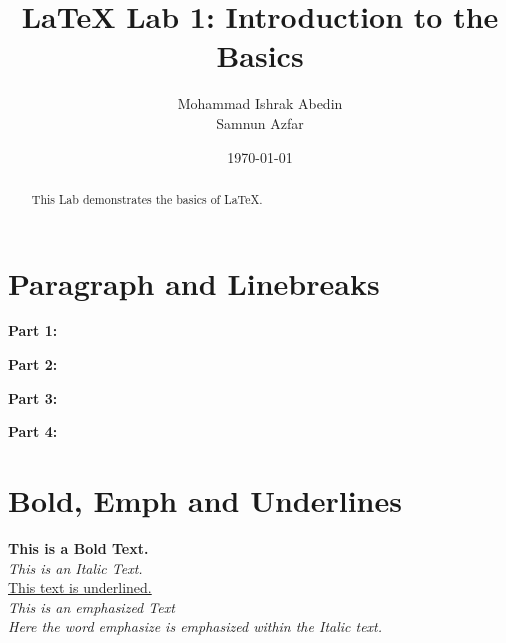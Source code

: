 \documentclass[a4paper,10pt]{article} %
\title{\LaTeX{} Lab 1: Introduction to the Basics}
\author{Mohammad Ishrak Abedin \\ Samnun Azfar}
\date{\today}
\begin{document}


\begin{titlepage}
    \maketitle 
\end{titlepage}

\tableofcontents
\newpage

\begin{abstract}
    This Lab demonstrates the basics of \LaTeX. \lipsum[1]
\end{abstract}



\section{Paragraph and Linebreaks}


\textbf{Part 1:} \lipsum[1]\lipsum[2] %

\textbf{Part 2:} \lipsum[1]\par\lipsum[2] %

\newpage %

\textbf{Part 3:} \lipsum[1]\\\lipsum[2] %

\textbf{Part 4:} \lipsum[1]\newline\lipsum[2]\\ %



\section{Bold, Emph and Underlines}

\noindent
\textbf{This is a Bold Text.}\\
\textit{This is an Italic Text.}\\
\underline{This text is underlined.}\\
\emph{This is an emphasized Text}\\
\textit{Here the word \emph{emphasize} is emphasized within the Italic text.}
\end{document}
